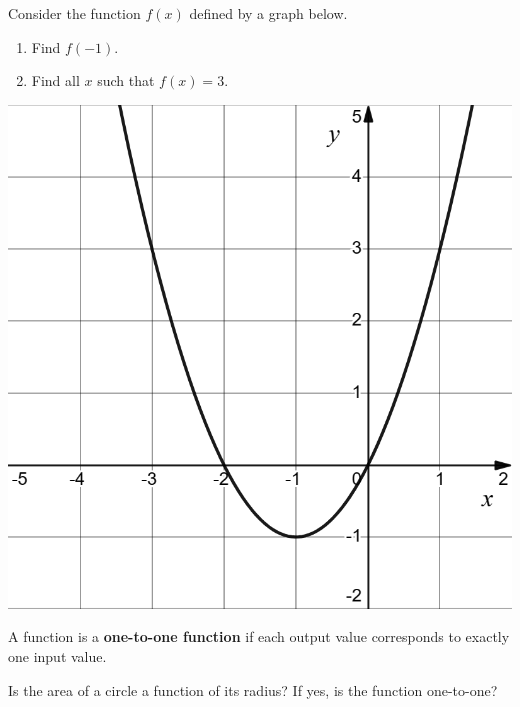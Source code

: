 \begin{example}
  Consider the function $f(x)$ defined by a graph below.

  \begin{multicols}{2}
    \begin{enumerate}
      \item Find $f(-1)$. 
      \item Find all $x$ such that $f(x)=3$.
    \end{enumerate}
    \vfill

    \columnbreak
    
    \begin{center}
      \includegraphics[scale=0.25]{figs/f(x)=x^2+2x.png}
    \end{center}
  \end{multicols}
\end{example}
\vspace*{-12\baselineskip}

\newpage

\begin{definition}
  A function is a \textbf{one-to-one function} if each output value corresponds to exactly one input value.
\end{definition}

\begin{example}
  Is the area of a circle a function of its radius? If yes, is the function one-to-one?
\end{example}

